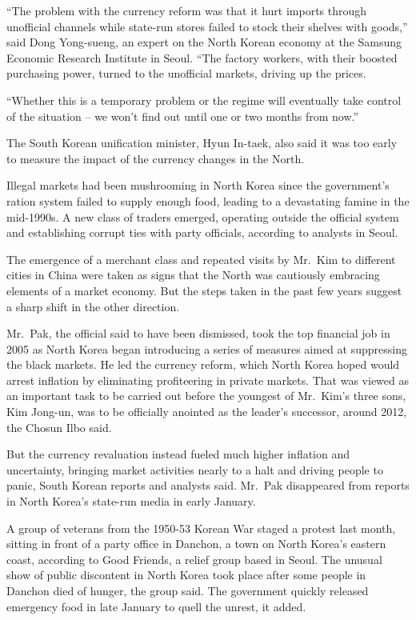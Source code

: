 ﻿\documentclass[12pt]{article}
\begin{document}
``The problem with the currency reform was that it hurt imports through unofficial channels while
state-run stores failed to stock their shelves with goods,'' said Dong Yong-sueng, an expert on the
North Korean economy at the Samsung Economic Research Institute in Seoul. ``The factory workers,
with their boosted purchasing power, turned to the unofficial markets, driving up the prices.

``Whether this is a temporary problem or the regime will eventually take control of the situation --
we won't find out until one or two months from now.''

The South Korean unification minister, Hyun In-taek, also said it was too early to measure the
impact of the currency changes in the North.

Illegal markets had been mushrooming in North Korea since the government's ration system failed to
supply enough food, leading to a devastating famine in the mid-1990s. A new class of traders
emerged, operating outside the official system and establishing corrupt ties with party officials,
according to analysts in Seoul.

The emergence of a merchant class and repeated visits by Mr.~Kim to different cities in China were
taken as signs that the North was cautiously embracing elements of a market economy. But the steps
taken in the past few years suggest a sharp shift in the other direction.

Mr.~Pak, the official said to have been dismissed, took the top financial job in 2005 as North Korea
began introducing a series of measures aimed at suppressing the black markets. He led the currency
reform, which North Korea hoped would arrest inflation by eliminating profiteering in private
markets. That was viewed as an important task to be carried out before the youngest of Mr.~Kim's
three sons, Kim Jong-un, was to be officially anointed as the leader's successor, around 2012, the
Chosun Ilbo said.

But the currency revaluation instead fueled much higher inflation and uncertainty, bringing market
activities nearly to a halt and driving people to panic, South Korean reports and analysts said.
Mr.~Pak disappeared from reports in North Korea's state-run media in early January.

A group of veterans from the 1950-53 Korean War staged a protest last month, sitting in front of a
party office in Danchon, a town on North Korea's eastern coast, according to Good Friends, a relief
group based in Seoul. The unusual show of public discontent in North Korea took place after some
people in Danchon died of hunger, the group said. The government quickly released emergency food in
late January to quell the unrest, it added.
\end{document}
